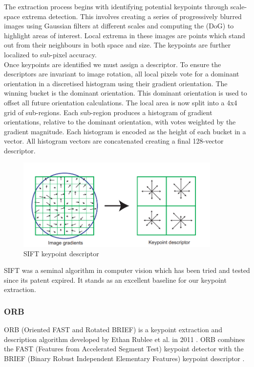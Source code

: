 The extraction process begins with identifying potential keypoints through scale-space extrema detection. This involves creating a series of progressively blurred images using Gaussian filters at different scales and computing the  (DoG) to highlight areas of interest. Local extrema in these images are points which stand out from their neighbours in both space and size. The keypoints are further localized to sub-pixel accuracy.\\

Once keypoints are identified we must assign a descriptor. To ensure the descriptors are invariant to image rotation, all local pixels vote for a dominant orientation in a discretised histogram using their gradient orientation. The winning bucket is the dominant orientation. This dominant orientation is used to offset all future orientation calculations. The local area is now split into a 4x4 grid of sub-regions. Each sub-region produces a histogram of gradient orientations, relative to the dominant orientation, with votes weighted by the gradient magnitude. Each histogram is encoded as the height of each bucket in a vector. All histogram vectors are concatenated creating a final 128-vector descriptor.\\

\begin{figure}[h]
    \centering
    \includegraphics[width=0.9\textwidth]{figures/SIFT.png}
    \caption{SIFT keypoint descriptor \cite{SIFT}}
    \label{fig:SIFT}
\end{figure}

SIFT was a seminal algorithm in computer vision which has been tried and tested since its patent expired. It stands as an excellent baseline for our keypoint extraction.

\subsubsection{ORB}
ORB (Oriented FAST and Rotated BRIEF) is a keypoint extraction and description algorithm developed by Ethan Rublee et al. in 2011 \cite{ORB}. ORB combines the FAST (Features from Accelerated Segment Test) keypoint detector \cite{FAST} with the BRIEF (Binary Robust Independent Elementary Features) keypoint descriptor \cite{BRIEF}.\\

